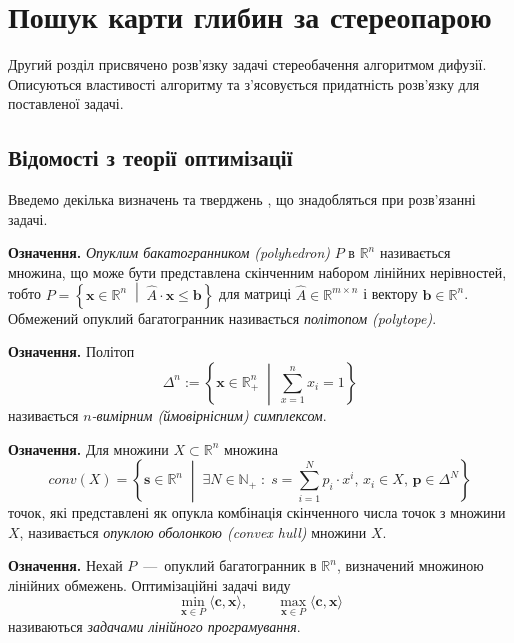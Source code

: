 \chapter{Пошук карти глибин за стереопарою}

Другий розділ присвячено розв'язку задачі стереобачення алгоритмом дифузії.
Описуються властивості алгоритму та з'ясовується придатність
розв'язку для поставленої задачі.

\section{Відомості з теорії оптимізації}
Введемо декілька визначень та тверджень \cite{overview:savchynskyy:diffusion},
що знадобляться при розв'язанні задачі.

\textbf{Означення.}
\textit{Опуклим бакатогранником (polyhedron)} $P$ в $\mathbb{R}^n$ називається множина,
що може бути представлена скінченним набором лінійних нерівностей,
тобто
$P = \left\{
    \pmb{x} \in \mathbb{R}^n \; \middle| \;
    \hat{A} \cdot \pmb{x} \le \pmb{b}
\right\}$
для матриці $\hat{A} \in \mathbb{R}^{m \times n}$ і вектору
$\pmb{b} \in \mathbb{R}^n$.
Обмежений опуклий багатогранник називається \textit{політопом (polytope)}.

\textbf{Означення.}
Політоп
\begin{equation} \label{eq:simplex}
    \Delta^n := \left\{
    \pmb{x} \in \mathbb{R}^n_+ \; \middle| \; \sum \limits_{x = 1}^n x_i = 1
    \right\}
\end{equation}
називається \textit{$n$-вимірним (ймовірнісним) симплексом}.

\textbf{Означення.}
Для множини $X \subset \mathbb{R}^n$ множина
\begin{equation*}
    conv \left(X \right) = \left\{
        \pmb{s} \in \mathbb{R}^n \; \middle| \;
        \exists N \in \mathbb{N}_+ \; : \;
        s = \sum \limits_{i = 1}^N p_i \cdot x^i, \,
        x_i \in X, \,
        \pmb{p} \in \Delta^N
    \right\}
\end{equation*}
точок,
які представлені як опукла комбінація скінченного числа точок з множини $X$,
називається \textit{опуклою оболонкою (convex hull)} множини $X$.

\textbf{Означення.}
Нехай $P$~---~опуклий багатогранник в $\mathbb{R}^n$,
визначений множиною лінійних обмежень.
Оптимізаційні задачі виду
\begin{equation*}
    \min \limits_{\pmb{x} \in P} \langle \pmb{c}, \pmb{x} \rangle, \qquad
    \max \limits_{\pmb{x} \in P} \langle \pmb{c}, \pmb{x} \rangle
\end{equation*}
називаються \textit{задачами лінійного програмування}.

